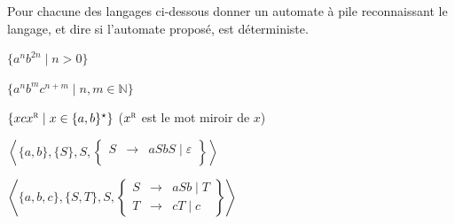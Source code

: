 
\begingroup

\begin{exercice}\label{exo:parsing/decision/non_deterministic_pushdown}

  Pour chacune des langages ci-dessous donner un automate à pile reconnaissant le langage, et dire si l'automate proposé, est déterministe. 
  \begin{questions}
  \item $\{ a^n b^{2n} \mid  n > 0\}$
  \item $\{a^n b^m c^{n+m} \mid n, m  \in \mathbb{N}\}$
  \item $\{x c x^\textsc{r} \mid  x \in \{a, b\}^\star  \}$ ($x^\textsc{r}$ est le mot miroir de $x$)
  \item $\left\langle \{a, b\}, \{S\}, S,
    \left\{\begin{array}{rcl}
    S &\rightarrow& aSbS \mid \varepsilon\\
    \end{array}\right\}  \right\rangle$
  \item $\left\langle \{a, b, c\}, \{S, T\}, S,
    \left\{\begin{array}{rcl}
    S &\rightarrow& a S b \mid  T\\
    T &\rightarrow& cT \mid  c
    \end{array}\right\}  \right\rangle$
  \end{questions}

\end{exercice}

